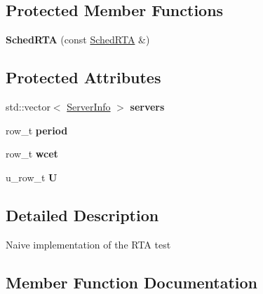 \subsection*{Protected Member Functions}
\begin{DoxyCompactItemize}
\item 
{\bfseries Sched\+R\+TA} (const \hyperlink{classRTSim_1_1SchedRTA}{Sched\+R\+TA} \&)\hypertarget{classRTSim_1_1SchedRTA_ac1e439ec0ec0e86f280cd98b289c002d}{}\label{classRTSim_1_1SchedRTA_ac1e439ec0ec0e86f280cd98b289c002d}

\end{DoxyCompactItemize}
\subsection*{Protected Attributes}
\begin{DoxyCompactItemize}
\item 
std\+::vector$<$ \hyperlink{structRTSim_1_1SchedRTA_1_1ServerInfo}{Server\+Info} $>$ {\bfseries servers}\hypertarget{classRTSim_1_1SchedRTA_a7d03ac7e6a5c5701df0d8f2da96d7013}{}\label{classRTSim_1_1SchedRTA_a7d03ac7e6a5c5701df0d8f2da96d7013}

\item 
row\+\_\+t {\bfseries period}\hypertarget{classRTSim_1_1SchedRTA_a54315c61cfb190e5cb9715da9e0ca83b}{}\label{classRTSim_1_1SchedRTA_a54315c61cfb190e5cb9715da9e0ca83b}

\item 
row\+\_\+t {\bfseries wcet}\hypertarget{classRTSim_1_1SchedRTA_a909236183f742e5b48ca9290d0eb5085}{}\label{classRTSim_1_1SchedRTA_a909236183f742e5b48ca9290d0eb5085}

\item 
u\+\_\+row\+\_\+t {\bfseries U}\hypertarget{classRTSim_1_1SchedRTA_a88912fcbd7e23f93d7c9fd2851314d10}{}\label{classRTSim_1_1SchedRTA_a88912fcbd7e23f93d7c9fd2851314d10}

\end{DoxyCompactItemize}


\subsection{Detailed Description}
Naive implementation of the R\+TA test 

\subsection{Member Function Documentation}
